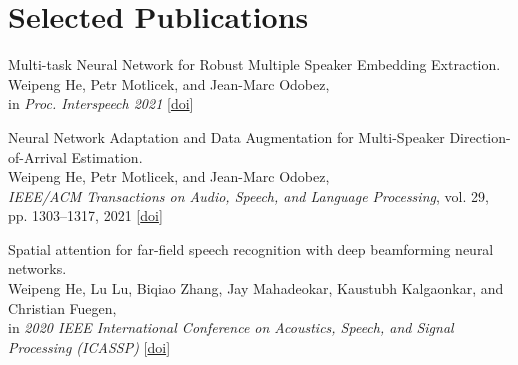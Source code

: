 \documentclass[a4paper,9pt]{extarticle} %
\begin{document}
\section{Selected Publications}
\begin{enumerate}[label={[\arabic*]}]

  \item Multi-task Neural Network for Robust Multiple Speaker Embedding Extraction. \\
        Weipeng He, Petr Motlicek, and Jean-Marc Odobez, \\
        in \textit{Proc. Interspeech 2021}
        [\href{https://doi.org/10.21437/Interspeech.2021-1769}{doi}]

  \item Neural Network Adaptation and Data Augmentation for Multi-Speaker Direction-of-Arrival Estimation. \\
        Weipeng He, Petr Motlicek, and Jean-Marc Odobez, \\
        \textit{IEEE/ACM Transactions on Audio, Speech, and Language Processing}, vol. 29, pp. 1303–1317, 2021
        [\href{https://doi.org/10.1109/TASLP.2021.3060257}{doi}]


  \item Spatial attention for far-field speech recognition with deep beamforming neural networks. \\
        Weipeng He, Lu Lu, Biqiao Zhang, Jay Mahadeokar, Kaustubh Kalgaonkar, and Christian Fuegen, \\
        in \textit{2020 IEEE International Conference on Acoustics, Speech, and Signal Processing (ICASSP)}
        [\href{https://doi.org/10.1109/ICASSP40776.2020.9053439}{doi}]


\end{enumerate}
\end{document}

